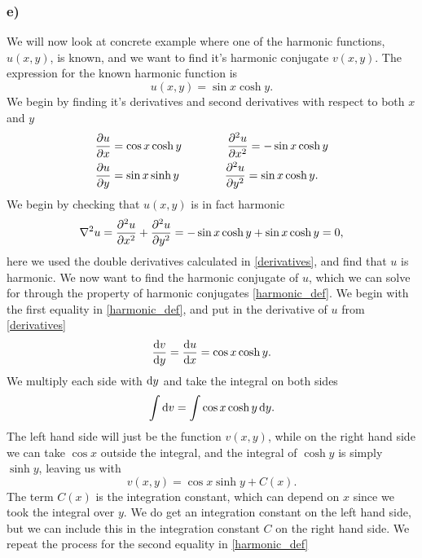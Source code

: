 \documentclass[12pt,twoside]{article}
\begin{document}
\subsubsection*{e)}
We will now look at concrete example where one of the harmonic functions, $u(x, y)$, is known, and we want to find it's harmonic conjugate $v(x,y)$. The expression for the known harmonic function is
\begin{equation}
  u(x,y) = \sin{x}\cosh{y}.
\end{equation}
We begin by finding it's derivatives and second derivatives with respect to both $x$ and $y$
\begin{align}
  \begin{split}
  \pdv{u}{x} &= \cos{x}\cosh{y}\qquad \qquad\pdv[2]{u}{x} = -\sin{x}\cosh{y} \\
  \pdv{u}{y} &= \sin{x}\sinh{y}\qquad \qquad\pdv[2]{u}{y} = \sin{x}\cosh{y}. \label{derivatives}
\end{split}
\end{align}
We begin by checking that $u(x, y)$ is in fact harmonic
\begin{equation}
  \nabla^2u = \pdv[2]{u}{x}+\pdv[2]{u}{y} = -\sin{x}\cosh{y} + \sin{x}\cosh{y} = 0,
\end{equation}
here we used the double derivatives calculated in \eqref{derivatives}, and find that $u$ is harmonic. We now want to find the harmonic conjugate of $u$, which we can solve for through the property of harmonic conjugates \eqref{harmonic_def}. We begin with the first equality in \eqref{harmonic_def}, and put in the derivative of $u$ from \eqref{derivatives}
\begin{equation}
  \dv{v}{y} = \dv{u}{x} = \cos{x}\cosh{y}.
\end{equation}
We multiply each side with $\dif y$ and take the integral on both sides
\begin{equation}
  \int \dif v =  \int \cos{x}\cosh{y} \dif y.
\end{equation}
The left hand side will just be the function $v(x, y)$, while on the right hand side we can take $\cos{x}$ outside the integral, and the integral of $\cosh{y}$ is simply $\sinh{y}$, leaving us with
\begin{equation}
  v(x, y) =  \cos{x}\sinh{y} + C(x). \label{first}
\end{equation}
The term $C(x)$ is the integration constant, which can depend on $x$ since we took the integral over $y$. We do get an integration constant on the left hand side, but we can include this in the integration constant $C$ on the right hand side. We repeat the process for the second equality in \eqref{harmonic_def}
\end{document}
